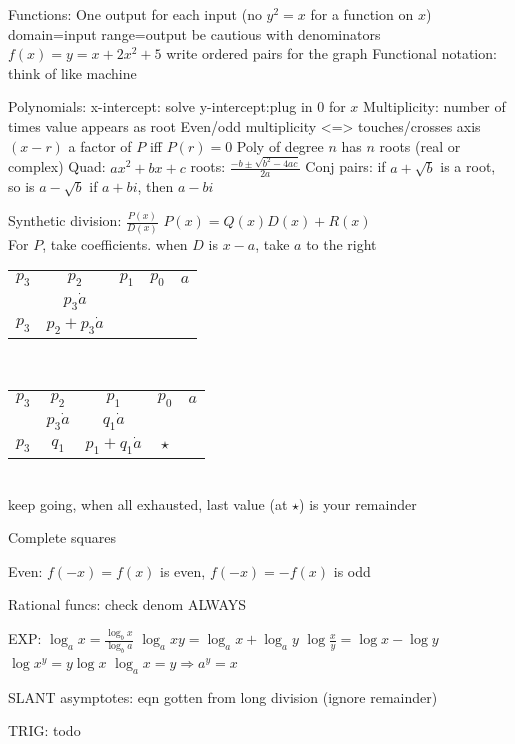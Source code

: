 \documentclass{article}
\begin{document}
Functions:
One output for each input (no $y^2=x$ for a function on $x$)
domain=input
range=output
be cautious with denominators
$f(x)=y=x+2x^2+5$
write ordered pairs for the graph
Functional notation: think of like machine

Polynomials:
x-intercept: solve
y-intercept:plug in 0 for $x$
Multiplicity: number of times value appears as root
Even/odd multiplicity <=> touches/crosses axis
$(x-r)$ a factor of $P$ iff $P(r)=0$
Poly of degree $n$ has $n$ roots (real or complex)
Quad: $ax^2+bx+c$ roots: $\frac{-b\pm\sqrt{b^2-4ac}}{2a}$
Conj pairs: if $a+\sqrt{b}$ is a root, so is $a-\sqrt{b}$
if $a+bi$, then $a-bi$

Synthetic division:
$\frac{P(x)}{D(x)}$
$P(x)=Q(x)D(x)+R(x)$\\
For $P$, take coefficients. when $D$ is $x-a$, take $a$ to the right\\
\begin{tabular}{c c c c | c}
$p_3$ & $p_2$ & $p_1$ & $p_0$ & $a$\\
 & $p_3\dot a$ & & & \\
\hline
$p_3$ & $p_2+p_3\dot a$ & & & \\
\end{tabular}\\
\begin{tabular}{c c c c | c}
$p_3$ & $p_2$ & $p_1$ & $p_0$ & $a$\\
 & $p_3\dot a$ & $q_1\dot a$ & & \\
\hline
$p_3$ & $q_1$ & $p_1+q_1\dot a$ & $\star$ &  \\
\end{tabular}\\
keep going, when all exhausted, last value (at $\star$) is your remainder

Complete squares

Even: $f(-x)=f(x)$ is even, $f(-x)=-f(x)$ is odd

Rational funcs: check denom ALWAYS


EXP:
$\log_a{x}=\frac{\log_b{x}}{\log_b{a}}$
$\log_a{xy}=\log_a{x}+\log_a{y}$
$\log{\frac{x}{y}}=\log{x}-\log{y}$
$\log{x^y}=y\log{x}$
$\log_a{x}=y\Rightarrow a^y=x$

SLANT asymptotes:
eqn gotten from long division (ignore remainder)

TRIG: todo
\end{document}
